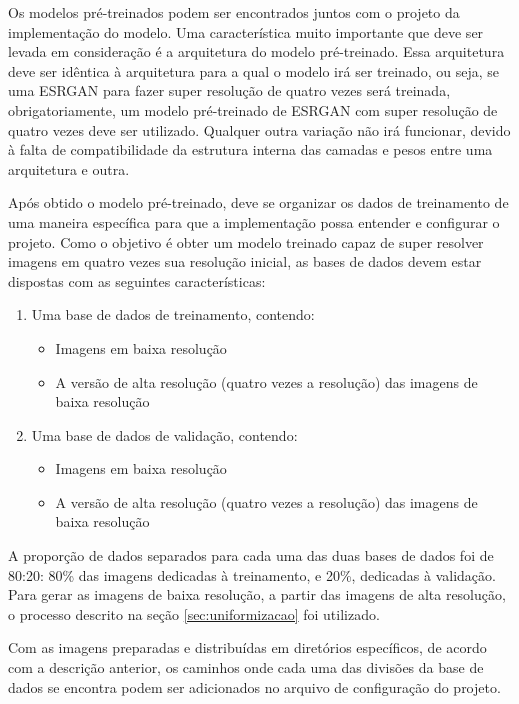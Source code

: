 Os modelos pré-treinados podem ser encontrados juntos com o projeto da implementação do modelo. Uma característica muito importante que deve ser levada em consideração é a arquitetura do modelo pré-treinado. Essa arquitetura deve ser idêntica à arquitetura para a qual o modelo irá ser treinado, ou seja, se uma ESRGAN para fazer super resolução de quatro vezes será treinada, obrigatoriamente, um modelo pré-treinado de ESRGAN com super resolução de quatro vezes deve ser utilizado. Qualquer outra variação não irá funcionar, devido à falta de compatibilidade da estrutura interna das camadas e pesos entre uma arquitetura e outra.

Após obtido o modelo pré-treinado, deve se organizar os dados de treinamento de uma maneira específica para que a implementação possa entender e configurar o projeto. Como o objetivo é obter um modelo treinado capaz de super resolver imagens em quatro vezes sua resolução inicial, as bases de dados devem estar dispostas com as seguintes características:

\begin{enumerate}
    \item Uma base de dados de treinamento, contendo:
    \begin{itemize}
        \item Imagens em baixa resolução 
        \item A versão de alta resolução (quatro vezes a resolução) das imagens de baixa resolução
    \end{itemize}
    \item Uma base de dados de validação, contendo:
    \begin{itemize}
        \item Imagens em baixa resolução
        \item A versão de alta resolução (quatro vezes a resolução) das imagens de baixa resolução
    \end{itemize}
\end{enumerate}

A proporção de dados separados para cada uma das duas bases de dados foi de 80:20: 80\% das imagens dedicadas à treinamento, e 20\%, dedicadas à validação. Para gerar as imagens de baixa resolução, a partir das imagens de alta resolução, o processo descrito na seção \ref{sec:uniformizacao} foi utilizado. 

Com as imagens preparadas e distribuídas em diretórios específicos, de acordo com a descrição anterior, os caminhos onde cada uma das divisões da base de dados se encontra podem ser adicionados no arquivo de configuração do projeto.

